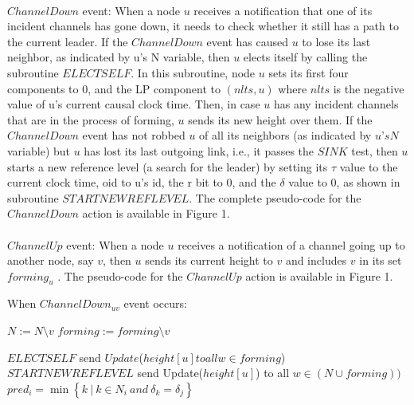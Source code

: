 \paragraph{}$ChannelDown$ event: When a node $u$ receives a notification that one of its incident channels has gone down, it needs to check whether it still has a path to the current leader. If the $ChannelDown$ event has caused $u$ to lose its last neighbor, as indicated by u’s N variable, then $u$ elects itself by calling the subroutine $ELECTSELF$. In this subroutine, node $u$ sets its first four components to 0, and the LP component to $(nlts,u)$ where $nlts$ is the negative value of u’s current causal clock time. Then, in case $u$ has any incident channels that are in the process of forming, $u$ sends its new height over them. If the $ChannelDown$ event has not robbed $u$ of all its neighbors (as indicated by $u’s N$ variable) but $u$ has lost its last outgoing link, i.e., it passes the $SINK$ test, then $u$ starts a new reference level (a search for the leader) by setting its $\tau$ value to the current clock time, oid to u’s id, the r bit to 0, and the $\delta$ value to $0$, as shown in subroutine $STARTNEWREFLEVEL$. The complete pseudo-code for the $ChannelDown$ action is available in Figure 1.

\paragraph{}$ChannelUp$ event: When a node $u$ receives a notification of a channel going up to another node, say $v$, then $u$ sends its current height to $v$ and includes $v$ in its set $forming_u$ . The pseudo-code for the $ChannelUp$ action is available in Figure 1.

\begin{algorithm}
	\caption{When $ChannelDown_{uv}$ event occurs:}
	\begin{algorithmic}[1]
		
		\State $N := N \setminus {v}$
		\State $forming := forming \setminus {v}$
		
		\State $ELECTSELF$
		\State send $Update$($height[u] to all w\in forming$)
		\State $STARTNEWREFLEVEL$
		\State send Update($height[u]$) to all $w \in (N \cup forming))$
		\State $pred_i = \min \left\lbrace  k~|~k \in N_i~and~\delta _k = \delta _j \right\rbrace  $
		\EndIf
		
		
	\end{algorithmic}

\end{algorithm}

